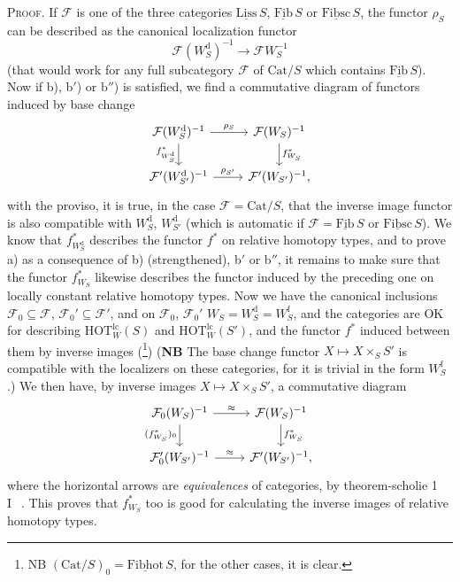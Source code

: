 \documentclass[11pt]{article}
\newcommand{\printedpage}[1]{\marginpar{\footnotesize p.~#1}}
\newcommand{\msp}[1]{\marginpar{\footnotesize [#1]}}
\newcommand{\und}[1]{\underline{\mathrm{#1}}}
\newcommand{\HOT}{\mathrm{HOT}}
\newcommand{\Cat}{\mathrm{Cat}}
\begin{document}
\textsc{Proof.} If $\mathcal{F}$ is one of the three categories $\und{Liss}\,S$, $\und{Fib}\,S$ or $\und{Fibsc}\,S$, the functor $\rho_S$ can be described as the canonical localization functor
\[
\mathcal{F}(W_S^{\mathrm{d}})^{-1} \longrightarrow \mathcal{F}W_S^{-1}
\]
(that would work for any full subcategory $\mathcal{F}$ of $\Cat/S$ which contains $\und{Fib}\,S$). Now if b), b$'$) or b$''$) is satisfied, we find a commutative diagram of functors induced by base change
\[
\begin{tikzcd}
\mathcal{F}(W_S^{\mathrm{d}})^{-1} \arrow[r, "\rho_S"] \arrow[d, "f^*_{W_S^{\mathrm{d}}}"'] & \mathcal{F}(W_S)^{-1} \arrow[d, "f^*_{W_S}"] \\
\mathcal{F}'(W_{S'}^{\mathrm{d}})^{-1} \arrow[r, "\rho_{S'}"] & \mathcal{F}'(W_{S'})^{-1},
\end{tikzcd}
\]
with the proviso, it is true, in the case $\mathcal{F} = \Cat/S$, that the inverse image functor is also compatible with $W_S^{\mathrm{d}}$, $W_{S'}^{\mathrm{d}}$ (which is automatic if $\mathcal{F} = \und{Fib}\,S$ or $\und{Fibsc}\,S$). We know that $f^*_{W_S^{\mathrm{d}}}$ describes the functor $f^*$ on relative homotopy types, and to prove a) as a consequence
\msp{page 125}
of b) (strengthened), b$'$ or b$''$, it remains to make sure that the functor $f^*_{W_S}$ likewise describes the functor induced by the preceding one on locally constant relative homotopy types. Now we have the canonical inclusions $\mathcal{F}_0 \subseteq \mathcal{F}$, $\mathcal{F}_0' \subseteq \mathcal{F}'$, and on $\mathcal{F}_0$, $\mathcal{F}_0'$ $W_S = W_S^{\mathrm{d}} = W_S^{\mathrm{f}}$, and the categories are OK for describing $\HOT_W^{\mathrm{lc}}(S)$ and $\HOT_W^{\mathrm{lc}}(S')$, and the functor $f^*$ induced between them by inverse images (\footnote[65]{NB $(\Cat/S)_0 = \und{Fibhot}\,S$, for the other cases, it is clear.}) (\textbf{NB} The base change functor $X \longmapsto X \times_S S'$ is compatible with the localizers on these categories, for it is trivial in the form $W_S^{\mathrm{f}}$.) We then have, by inverse images $X \longmapsto X \times_S S'$, a commutative diagram
\[
\begin{tikzcd}
\mathcal{F}_0(W_S)^{-1} \arrow[r, "\approx"] \arrow[d, "(f^*_{W_S})_0"'] & \mathcal{F}(W_S)^{-1} \arrow[d, "f^*_{W_S}"] \\
\mathcal{F}_0'(W_{S'})^{-1} \arrow[r, "\approx"] & \mathcal{F}'(W_{S'})^{-1},
\end{tikzcd}
\]
\printedpage{78}
where the horizontal arrows are \textit{equivalences} of categories, by theorem-scholie 1 \textcircled{I}~. This proves that $f^*_{W_S}$ too is good for calculating the inverse images of relative homotopy types.
\end{document}
